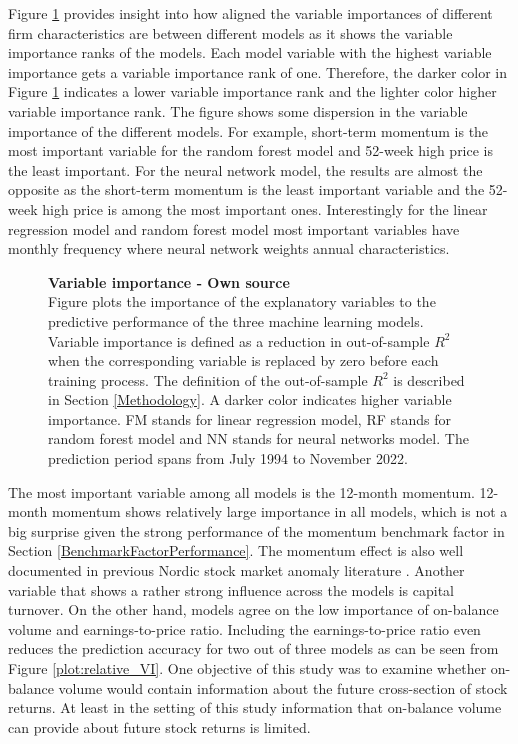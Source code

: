 \documentclass[12pt]{article}
\begin{document}
Figure \ref{plot:combined_VI} provides insight into how aligned the variable importances of different firm characteristics are between different models as it shows the variable importance ranks of the models. Each model variable with the highest variable importance gets a variable importance rank of one. Therefore, the darker color in Figure \ref{plot:combined_VI} indicates a lower variable importance rank and the lighter color higher variable importance rank. The figure shows some dispersion in the variable importance of the different models. For example, short-term momentum is the most important variable for the random forest model and 52-week high price is the least important. For the neural network model, the results are almost the opposite as the short-term momentum is the least important variable and the 52-week high price is among the most important ones. Interestingly for the linear regression model and random forest model most important variables have monthly frequency where neural network weights annual characteristics. \par

\begin{figure}[ht]
\centering
\caption[Variable importance]{\textbf{Variable importance \textnormal{- Own source}}\\ Figure plots the importance of the explanatory variables to the predictive performance of the three machine learning models. Variable importance is defined as a reduction in out-of-sample $R^2$ when the corresponding variable is replaced by zero before each training process. The definition of the out-of-sample $R^2$ is described in Section \ref{Methodology}. A darker color indicates higher variable importance. FM stands for linear regression model, RF stands for random forest model and NN stands for neural networks model. The prediction period spans from July 1994 to November 2022.}

\label{plot:combined_VI}
\end{figure}

The most important variable among all models is the 12-month momentum. 12-month momentum shows relatively large importance in all models, which is not a big surprise given the strong performance of the momentum benchmark factor in Section \ref{BenchmarkFactorPerformance}. The momentum effect is also well documented in previous Nordic stock market anomaly literature  \citep[e.g.][]{grobys, leivo2011}. Another variable that shows a rather strong influence across the models is capital turnover. On the other hand, models agree on the low importance of on-balance volume and earnings-to-price ratio. Including the earnings-to-price ratio even reduces the prediction accuracy for two out of three models as can be seen from Figure \ref{plot:relative_VI}. One objective of this study was to examine whether on-balance volume would contain information about the future cross-section of stock returns. At least in the setting of this study information that on-balance volume can provide about future stock returns is limited. \par
\end{document}

